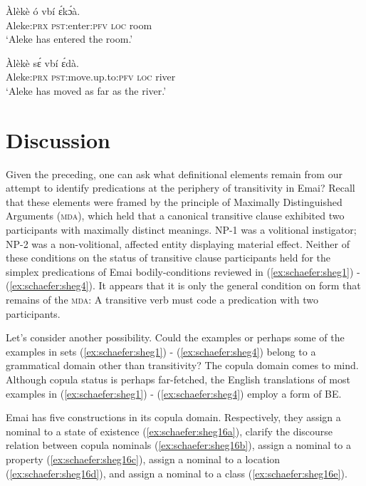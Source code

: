 \documentclass[output=paper,colorlinks,citecolor=brown
]{langscibook}
\begin{document}
 \ea \label{ex:schaefer:sheg15}
\begin{xlist}
\ex \label{ex:schaefer:sheg15a}
    \gll Àlèkè ó vbí ɛ́kɔ́à. \\
        {Aleke:\textsc{prx}} {\textsc{pst}:enter:\textsc{pfv}} \textsc{loc} room \\
           \glt ‘Aleke has entered the room.’

\ex \label{ex:schaefer:sheg15b}
    \gll Àlèkè sɛ́ vbí ɛ́dà. \\
        {Aleke:\textsc{prx}} {\textsc{pst}:move.up.to:\textsc{pfv}} \textsc{loc} river \\
           \glt ‘Aleke has moved as far as the river.’

\end{xlist}
\z	

\section{Discussion}

Given the preceding, one can ask what definitional elements remain from our attempt to identify predications at the periphery of transitivity in Emai? Recall that these elements were framed by the principle of Maximally Distinguished Arguments (\textsc{mda}), which held that a canonical transitive clause exhibited two participants with maximally distinct meanings. NP-1 was a volitional instigator; NP-2 was a non-volitional, affected entity displaying material effect. Neither of these conditions on the status of transitive clause participants held for the simplex predications of Emai bodily-conditions reviewed in (\ref{ex:schaefer:sheg1}) - (\ref{ex:schaefer:sheg4}). It appears that it is only the general condition on form that remains of the \textsc{mda}: A transitive verb must code a predication with two participants. 

Let’s consider another possibility. Could the examples or perhaps some of the examples in sets (\ref{ex:schaefer:sheg1}) - (\ref{ex:schaefer:sheg4}) belong to a grammatical domain other than transitivity? The copula domain comes to mind. Although copula status is perhaps far-fetched, the English translations of most examples in (\ref{ex:schaefer:sheg1}) - (\ref{ex:schaefer:sheg4}) employ a form of BE. 

 Emai has five constructions in its copula domain. Respectively, they assign a nominal to a state of existence (\ref{ex:schaefer:sheg16a}), clarify the discourse relation between copula nominals (\ref{ex:schaefer:sheg16b}), assign a nominal to a property (\ref{ex:schaefer:sheg16c}), assign a nominal to a location (\ref{ex:schaefer:sheg16d}), and assign a nominal to a class (\ref{ex:schaefer:sheg16e}).  
\end{document}
